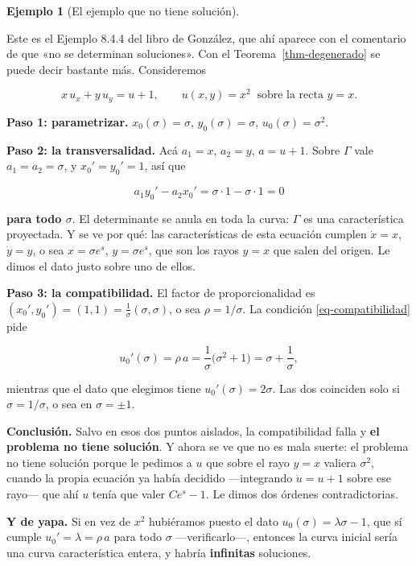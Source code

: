 \documentclass[
  spanish,
  a4paper,
]{scrbook}
\theoremstyle{definition}
\theoremstyle{plain}
\theoremstyle{definition}
\newtheorem{example}{Ejemplo}[chapter]
\theoremstyle{plain}
\theoremstyle{definition}
\theoremstyle{remark}
\begin{document}
\begin{example}[El ejemplo que no tiene
solución]\protect\hypertarget{exm-sin-solucion}{}\label{exm-sin-solucion}

Este es el Ejemplo 8.4.4 del libro de González, que ahí aparece con el
comentario de que «no se determinan soluciones». Con el
Teorema~\ref{thm-degenerado} se puede decir bastante más. Consideremos

\[
x\,u_x + y\,u_y = u + 1, \qquad u(x,y) = x^2 \ \text{ sobre la recta } y = x .
\]

\textbf{Paso 1: parametrizar.} \(x_0(\sigma) = \sigma\),
\(y_0(\sigma) = \sigma\), \(u_0(\sigma) = \sigma^2\).

\textbf{Paso 2: la transversalidad.} Acá \(a_1 = x\), \(a_2 = y\),
\(a = u+1\). Sobre \(\Gamma\) vale \(a_1 = a_2 = \sigma\), y
\(x_0' = y_0' = 1\), así que

\[
a_1 y_0' - a_2 x_0' = \sigma\cdot 1 - \sigma\cdot 1 = 0
\]

\textbf{para todo \(\sigma\)}. El determinante se anula en toda la
curva: \(\Gamma\) es una característica proyectada. Y se ve por qué: las
características de esta ecuación cumplen \(\dot x = x\), \(\dot y = y\),
o sea \(x = \sigma e^{s}\), \(y = \sigma e^{s}\), que son los rayos
\(y=x\) que salen del origen. Le dimos el dato justo sobre uno de ellos.

\textbf{Paso 3: la compatibilidad.} El factor de proporcionalidad es
\((x_0',y_0') = (1,1) = \tfrac{1}{\sigma}(\sigma,\sigma)\), o sea
\(\rho = 1/\sigma\). La condición \ref{eq-compatibilidad} pide

\[
u_0'(\sigma) = \rho\,a = \frac{1}{\sigma}\big(\sigma^2 + 1\big) = \sigma + \frac{1}{\sigma},
\]

mientras que el dato que elegimos tiene \(u_0'(\sigma) = 2\sigma\). Las
dos coinciden solo si \(\sigma = 1/\sigma\), o sea en
\(\sigma = \pm 1\).

\textbf{Conclusión.} Salvo en esos dos puntos aislados, la
compatibilidad falla y \textbf{el problema no tiene solución}. Y ahora
se ve que no es mala suerte: el problema no tiene solución porque le
pedimos a \(u\) que sobre el rayo \(y=x\) valiera \(\sigma^2\), cuando
la propia ecuación ya había decidido ---integrando \(\dot u = u+1\)
sobre ese rayo--- que ahí \(u\) tenía que valer \(C e^{s} - 1\). Le
dimos dos órdenes contradictorias.

\textbf{Y de yapa.} Si en vez de \(x^2\) hubiéramos puesto el dato
\(u_0(\sigma) = \lambda\sigma - 1\), que sí cumple
\(u_0' = \lambda = \rho\,a\) para todo \(\sigma\) ---verificarlo---,
entonces la curva inicial sería una curva característica entera, y
habría \textbf{infinitas} soluciones.

\end{example}
\end{document}
